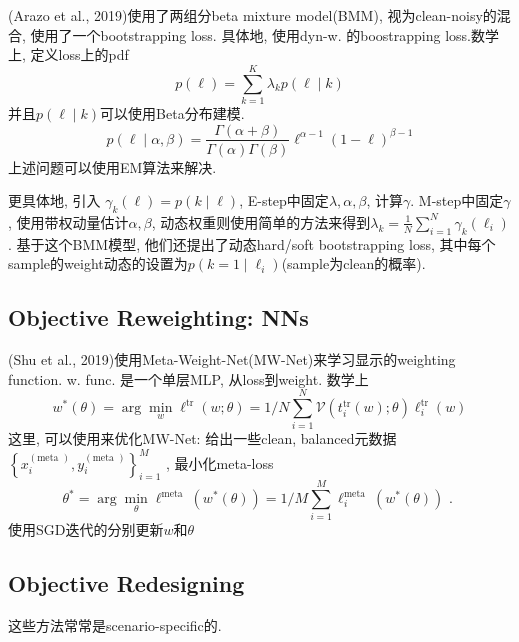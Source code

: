\documentclass{article}
\begin{document}
(Arazo et al., 2019)使用了两组分beta mixture model(BMM), 视为clean-noisy的混合, 使用了一个bootstrapping loss. 具体地, 使用dyn-w. 的boostrapping loss.数学上, 定义loss上的pdf
\begin{equation}
    p(\ell)=\sum_{k=1}^{K} \lambda_{k} p(\ell \mid k)
\end{equation}
并且$p(\ell \mid k)$可以使用Beta分布建模.
\begin{equation}
    p(\ell \mid \alpha, \beta)=\frac{\Gamma(\alpha+\beta)}{\Gamma(\alpha) \Gamma(\beta)} \ell^{\alpha-1}(1-\ell)^{\beta-1}
\end{equation}
上述问题可以使用EM算法来解决.

更具体地, 引入
$\gamma_{k}(\ell)=p(k \mid \ell)$, 
E-step中固定$\lambda, \alpha, \beta$, 计算$\gamma$.
M-step中固定$\gamma$, 使用带权动量估计$\alpha, \beta$, 动态权重则使用简单的方法来得到$\lambda_{k}=\frac{1}{N} \sum_{i=1}^{N} \gamma_{k}\left(\ell_{i}\right)$. 基于这个BMM模型, 他们还提出了动态hard/soft bootstrapping loss, 其中每个sample的weight动态的设置为$p\left(k=1 \mid \ell_{i}\right)$(sample为clean的概率).

\subsection{Objective Reweighting: NNs}

(Shu et al., 2019)使用Meta-Weight-Net(MW-Net)来学习显示的weighting function. w. func. 是一个单层MLP, 从loss到weight. 数学上
\begin{equation}
    w^{*}(\theta)=\arg \min _{w} \ell^{\operatorname{tr}}(w ; \theta)=1 / N \sum_{i=1}^{N} \mathcal{V}\left(t_{i}^{\operatorname{tr}}(w) ; \theta\right) \ell_{i}^{\mathrm{tr}}(w)
\end{equation}
这里, 可以使用来优化MW-Net: 给出一些clean, balanced元数据
$\left\{x_{i}^{(\text {meta })}, y_{i}^{(\text {meta })}\right\}_{i=1}^{M}$
, 最小化meta-loss
\begin{equation}
    \theta^{*}=\arg \min _{\theta} \ell^{\text {meta }}\left(w^{*}(\theta)\right)=1 / M \sum_{i=1}^{M} \ell_{i}^{\text {meta }}\left(w^{*}(\theta)\right) \text { . }
\end{equation}
使用SGD迭代的分别更新$w$和$\theta$

\subsection{Objective Redesigning}

这些方法常常是scenario-specific的.
\end{document}
